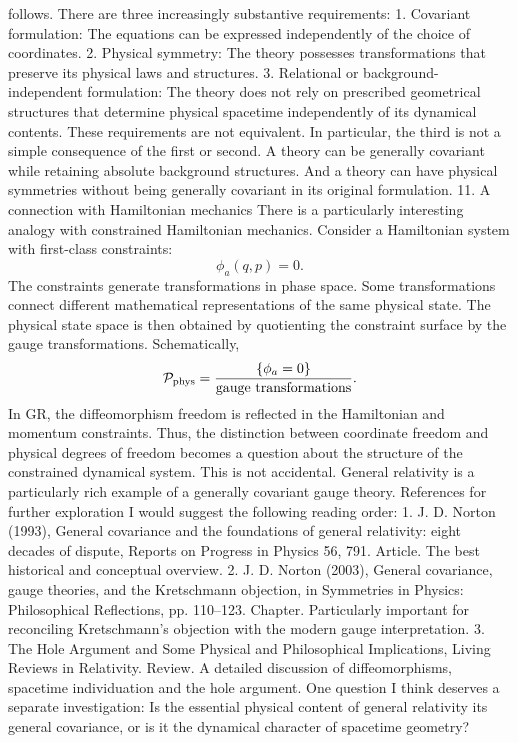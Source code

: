 follows. There are three increasingly substantive requirements: 1. Covariant
formulation: The equations can be expressed independently of the choice of
coordinates. 2. Physical symmetry: The theory possesses transformations that
preserve its physical laws and structures. 3. Relational or
background-independent formulation: The theory does not rely on prescribed
geometrical structures that determine physical spacetime independently of its
dynamical contents. These requirements are not equivalent. In particular, the
third is not a simple consequence of the first or second. A theory can be
generally covariant while retaining absolute background structures. And a
theory can have physical symmetries without being generally covariant in its
original formulation. 11. A connection with Hamiltonian mechanics There is a
particularly interesting analogy with constrained Hamiltonian mechanics.
Consider a Hamiltonian system with first-class constraints: \[ \phi_a(q,p)=0.
\] The constraints generate transformations in phase space. Some
transformations connect different mathematical representations of the same
physical state. The physical state space is then obtained by quotienting the
constraint surface by the gauge transformations. Schematically, \[ \mathcal
P_{\rm phys} = \frac{\{\phi_a=0\}}{\text{gauge transformations}}. \] In GR, the
diffeomorphism freedom is reflected in the Hamiltonian and momentum
constraints. Thus, the distinction between coordinate freedom and physical
degrees of freedom becomes a question about the structure of the constrained
dynamical system. This is not accidental. General relativity is a particularly
rich example of a generally covariant gauge theory. References for further
exploration I would suggest the following reading order: 1. J. D. Norton
(1993), General covariance and the foundations of general relativity: eight
decades of dispute, Reports on Progress in Physics 56, 791. Article. The best
historical and conceptual overview. 2. J. D. Norton (2003), General covariance,
gauge theories, and the Kretschmann objection, in Symmetries in Physics:
Philosophical Reflections, pp. 110–123. Chapter. Particularly important for
reconciling Kretschmann's objection with the modern gauge interpretation. 3.
The Hole Argument and Some Physical and Philosophical Implications, Living
Reviews in Relativity. Review. A detailed discussion of diffeomorphisms,
spacetime individuation and the hole argument. One question I think deserves a
separate investigation: Is the essential physical content of general relativity
its general covariance, or is it the dynamical character of spacetime geometry?

